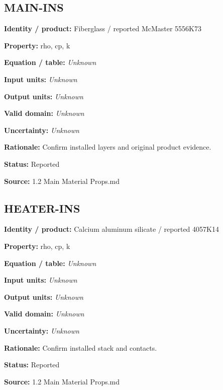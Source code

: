 \documentclass[11pt]{article}
\begin{document}
\par\noindent\begin{minipage}{\textwidth}\small\setlength{\parskip}{2pt}
\subsection*{MAIN-INS}
\textbf{Identity / product:} Fiberglass / reported McMaster 5556K73\par
\textbf{Property:} rho, cp, k\par
\textbf{Equation / table:} \textit{Unknown}\par
\textbf{Input units:} \textit{Unknown}\par
\textbf{Output units:} \textit{Unknown}\par
\textbf{Valid domain:} \textit{Unknown}\par
\textbf{Uncertainty:} \textit{Unknown}\par
\textbf{Rationale:} Confirm installed layers and original product evidence.\par
\textbf{Status:} Reported\par
\textbf{Source:} 1.2 Main Material Props.md\par
\end{minipage}\par\vspace{5pt}
\par\noindent\begin{minipage}{\textwidth}\small\setlength{\parskip}{2pt}
\subsection*{HEATER-INS}
\textbf{Identity / product:} Calcium aluminum silicate / reported 4057K14\par
\textbf{Property:} rho, cp, k\par
\textbf{Equation / table:} \textit{Unknown}\par
\textbf{Input units:} \textit{Unknown}\par
\textbf{Output units:} \textit{Unknown}\par
\textbf{Valid domain:} \textit{Unknown}\par
\textbf{Uncertainty:} \textit{Unknown}\par
\textbf{Rationale:} Confirm installed stack and contacts.\par
\textbf{Status:} Reported\par
\textbf{Source:} 1.2 Main Material Props.md\par
\end{minipage}\par\vspace{5pt}
\end{document}

